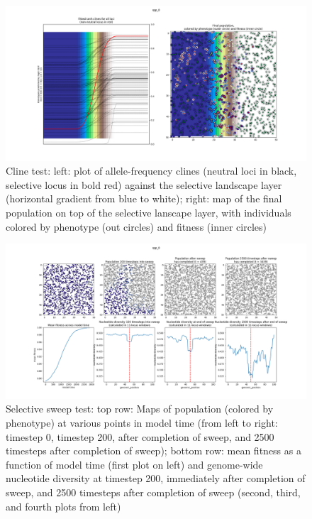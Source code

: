 ﻿\documentclass{article}
\begin{document}
\begin{figure}[h!]
\includegraphics[width=175mm]{./img/validation/cline/cline_adaptation_phi_0pt01_2500_timesteps.png}
        \caption{Cline test: left: plot of allele-frequency clines (neutral loci in black, selective locus in bold red) against the selective landscape layer (horizontal gradient from blue to white); right: map of the final population on top of the selective lanscape layer, with individuals colored by phenotype (out circles) and fitness (inner circles)}
        \label{fig:cline}
\end{figure}


\begin{figure}[h!]
\includegraphics[width=175mm]{./img/validation/sweep/sweep_results.png}
        \caption{Selective sweep test: top row: Maps of population (colored by phenotype) at various points in model time (from left to right: timestep 0, timestep 200, after completion of sweep, and 2500 timesteps after completion of sweep); bottom row: mean fitness as a function of model time (first plot on left) and genome-wide nucleotide diversity at timestep 200, immediately after completion of sweep, and 2500 timesteps after completion of sweep (second, third, and fourth plots from left)}
        \label{fig:sweep}
\end{figure}
\end{document}
